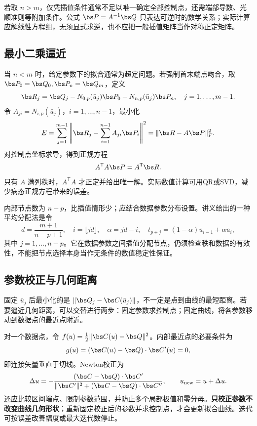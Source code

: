 若取 $n>m$，仅凭插值条件通常不足以唯一确定全部控制点，还需端部导数、光顺准则等附加条件。公式 $\bs P=A^{-1}\bs Q$ 只表达可逆时的数学关系；实际计算应解线性方程组，无须显式求逆，也不应把一般插值矩阵当作对称正定矩阵。

\subsection{最小二乘逼近}
当 $n<m$ 时，给定参数下的拟合通常为超定问题。若强制首末端点吻合，取 $\bs P_0=\bs Q_0,\bs P_n=\bs Q_m$，定义
\[
 \bs R_j=\bs Q_j-N_{0,p}(\bar u_j)\bs P_0
                    -N_{n,p}(\bar u_j)\bs P_n,\quad j=1,\ldots,m-1.
\]
令 $A_{ji}=N_{i,p}(\bar u_j)$，$i=1,\ldots,n-1$，最小化
\[
 E=\sum_{j=1}^{m-1}\left\|\bs R_j-\sum_{i=1}^{n-1}A_{ji}\bs P_i\right\|^2
   =\|\bs R-A\bs P\|_F^2.
\]
对控制点坐标求导，得到正规方程
\[
 A^{\mathsf T}A\bs P=A^{\mathsf T}\bs R.
\]
只有 $A$ 满列秩时，$A^{\mathsf T}A$ 才正定并给出唯一解。实际数值计算可用QR或SVD，减少病态正规方程带来的误差。

内部节点数为 $n-p$，比插值情形少；应结合数据参数分布设置。讲义给出的一种平均分配法是令
\[
 d=\frac{m+1}{n-p+1},\quad i=\lfloor jd\rfloor,\quad
 \alpha=jd-i,\quad t_{p+j}=(1-\alpha)\bar u_{i-1}+\alpha\bar u_i,
\]
其中 $j=1,\ldots,n-p$。它在数据参数之间插值分配节点，仍须检查秩和数据的有效性，不能把节点选择本身当作无条件的数值稳定性保证。


\subsection{参数校正与几何距离}
固定 $\bar u_j$ 后最小化的是 $\|\bs Q_j-\bs C(\bar u_j)\|$，不一定是点到曲线的最短距离。若要逼近几何距离，可以交替进行两步：固定参数求控制点；固定曲线，将各参数移动到数据点的最近点附近。

对一个数据点，令 $f(u)=\tfrac12\|\bs C(u)-\bs Q\|^2$。内部最近点的必要条件为
\[
 g(u)=(\bs C(u)-\bs Q)\cdot\bs C'(u)=0,
\]
即连接矢量垂直于切线。Newton校正为
\[
 \Delta u=-\frac{(\bs C-\bs Q)\cdot\bs C'}
 {\|\bs C'\|^2+(\bs C-\bs Q)\cdot\bs C''},\qquad
 u_{\mathrm{new}}=u+\Delta u.
\]
还应比较区间端点、限制参数范围，并防止多个局部极值和零分母。\textbf{只校正参数不改变曲线几何形状}；重新固定校正后的参数并求控制点，才会更新拟合曲线。迭代可按误差改善幅度或最大迭代数停止。

